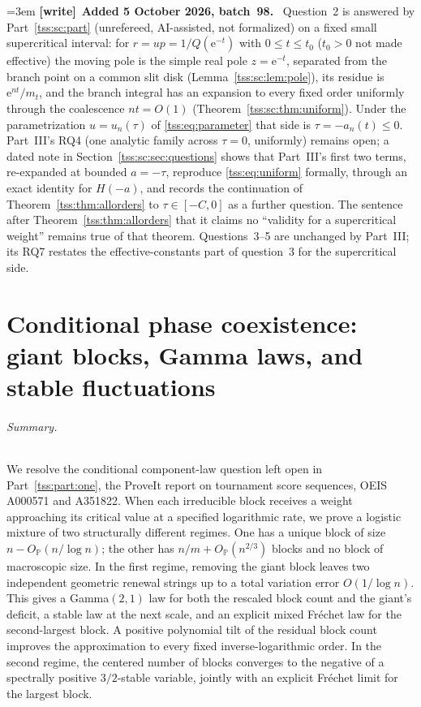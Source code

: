 \documentclass[11pt]{article}
\theoremstyle{remark}\newtheorem{remark}[theorem]{Remark}
\theoremstyle{definition}\newtheorem{definition}[theorem]{Definition}
\newcommand{\e}{\mathrm e}
\newcommand{\Prob}{\mathbb P}
\newenvironment{writenote}[1][]{\par\smallskip\begingroup\small\emergencystretch=3em
 \noindent\textbf{[write]}\if\relax\detokenize{#1}\relax\else~\textbf{#1.}\fi\ }%
 {\par\endgroup\smallskip}
\begin{document}
\begin{writenote}[Added 5 October 2026, batch~98]
Question~2 is answered by Part~\ref{tss:sc:part} (unrefereed, AI-assisted,
not formalized) on a fixed small supercritical interval: for
$r=up=1/Q(\e^{-t})$ with $0\le t\le t_0$ ($t_0>0$ not made effective) the
moving pole is the simple real pole $z=\e^{-t}$, separated from the branch
point on a common slit disk (Lemma~\ref{tss:sc:lem:pole}), its residue is
$\e^{nt}/m_t$, and the branch integral has an expansion to every fixed
order uniformly through the coalescence $nt=O(1)$
(Theorem~\ref{tss:sc:thm:uniform}). Under the parametrization
$u=u_n(\tau)$ of \eqref{tss:eq:parameter} that side is $\tau=-a_n(t)\le0$.
Part~III's RQ4 (one analytic family across $\tau=0$, uniformly) remains
open; a dated note in Section~\ref{tss:sc:sec:questions} shows that
Part~III's first two terms, re-expanded at bounded $a=-\tau$, reproduce
\eqref{tss:eq:uniform} formally, through an exact identity for $H(-a)$,
and records the continuation of Theorem~\ref{tss:thm:allorders} to
$\tau\in[-C,0]$ as a further question. The sentence after
Theorem~\ref{tss:thm:allorders} that it claims no ``validity for a
supercritical weight'' remains true of that theorem. Questions~3--5 are
unchanged by Part~III; its RQ7 restates the effective-constants part of
question~3 for the supercritical side.
\end{writenote}

\clearpage
{}
\part{Conditional phase coexistence: giant blocks, Gamma laws, and stable fluctuations}\label{tss:cx:part}

\paragraph{Summary.}
We resolve the conditional component-law question left open in
Part~\ref{tss:part:one}, the
ProveIt report on tournament score sequences, OEIS A000571 and A351822.
When each irreducible block receives a weight approaching its critical
value at a specified logarithmic rate, we prove a logistic mixture of two
structurally different regimes. One has a unique block of size
$n-O_{\Prob}(n/\log n)$; the other has $n/m+O_{\Prob}(n^{2/3})$ blocks
and no block of macroscopic size. In the first regime, removing the giant
block leaves two independent geometric renewal strings up to a total
variation error $O(1/\log n)$. This gives a Gamma$(2,1)$ law for both the
rescaled block count and the giant's deficit, a stable law at the next
scale, and an explicit mixed Fr\'echet law for the second-largest block.
A positive polynomial tilt of the residual block count improves the
approximation to every fixed inverse-logarithmic order.
In the second regime, the centered number of blocks converges to the
negative of a spectrally positive $3/2$-stable variable, jointly with
an explicit Fr\'echet limit for the largest block.
\end{document}
